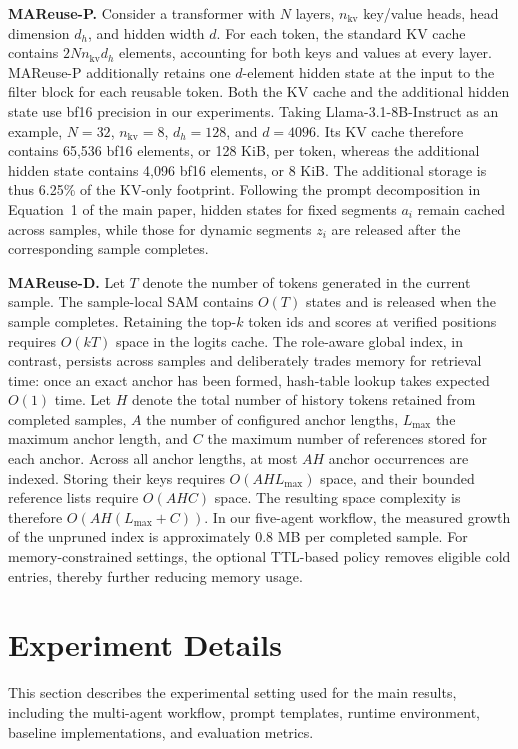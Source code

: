 \documentclass[letterpaper]{article} %
\begin{document}
\textbf{MAReuse-P.} Consider a transformer with $N$ layers, $n_{\mathrm{kv}}$ key/value heads, head dimension $d_h$, and hidden width $d$. For each token, the standard KV cache contains $2Nn_{\mathrm{kv}}d_h$ elements, accounting for both keys and values at every layer. MAReuse-P additionally retains one $d$-element hidden state at the input to the filter block for each reusable token. Both the KV cache and the additional hidden state use bf16 precision in our experiments. Taking Llama-3.1-8B-Instruct as an example, $N=32$, $n_{\mathrm{kv}}=8$, $d_h=128$, and $d=4096$. Its KV cache therefore contains 65,536 bf16 elements, or 128 KiB, per token, whereas the additional hidden state contains 4,096 bf16 elements, or 8 KiB. The additional storage is thus 6.25\% of the KV-only footprint. Following the prompt decomposition in Equation~1 of the main paper, hidden states for fixed segments $a_i$ remain cached across samples, while those for dynamic segments $z_i$ are released after the corresponding sample completes.

\textbf{MAReuse-D.} Let $T$ denote the number of tokens generated in the current sample. The sample-local SAM contains $O(T)$ states and is released when the sample completes. Retaining the top-$k$ token ids and scores at verified positions requires $O(kT)$ space in the logits cache. The role-aware global index, in contrast, persists across samples and deliberately trades memory for retrieval time: once an exact anchor has been formed, hash-table lookup takes expected $O(1)$ time. Let $H$ denote the total number of history tokens retained from completed samples, $A$ the number of configured anchor lengths, $L_{\max}$ the maximum anchor length, and $C$ the maximum number of references stored for each anchor. Across all anchor lengths, at most $AH$ anchor occurrences are indexed. Storing their keys requires $O(AHL_{\max})$ space, and their bounded reference lists require $O(AHC)$ space. The resulting space complexity is therefore $O(AH(L_{\max}+C))$. In our five-agent workflow, the measured growth of the unpruned index is approximately 0.8 MB per completed sample. For memory-constrained settings, the optional TTL-based policy removes eligible cold entries, thereby further reducing memory usage.


\section{Experiment Details}

This section describes the experimental setting used for the main results, including the multi-agent workflow, prompt templates, runtime environment, baseline implementations, and evaluation metrics.
\end{document}
